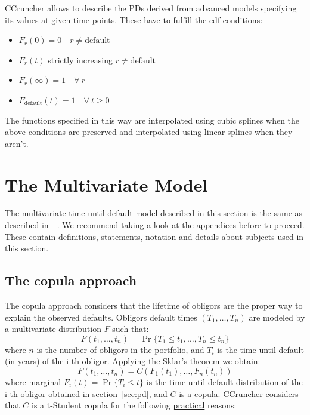 \documentclass[11pt,fleqn]{book} %
\begin{document}
CCruncher allows to describe the PDs derived from advanced models specifying 
its values at given time points. These have to fulfill the cdf conditions:
\begin{itemize}
	\item $F_r(0) = 0 \quad r \ne \text{default}$
	\item $F_r(t)$ strictly increasing $r \ne \text{default}$
	\item $F_r(\infty) = 1 \quad \forall\ r$
	\item $F_{\text{default}}(t) = 1 \quad \forall\ t \ge 0$
\end{itemize}
The functions specified in this way are interpolated using cubic splines
when the above conditions are preserved and interpolated using linear splines 
when they aren't.

\section{The Multivariate Model}

The multivariate time-until-default model described in this section is the 
same as described in~\cite{li:2000,roncalli:2001,frey:2001}~\cite[chap. 2.6]{bluhm:2002}.
We recommend taking a look at the appendices before to proceed. These contain 
definitions, statements, notation and details about subjects used in this 
section.

\subsection{The copula approach}
The copula approach considers that the lifetime of obligors are the 
proper way to explain the observed defaults. Obligors default times 
$(T_1,\dots,T_n)$ are modeled by a multivariate distribution $F$ such that:
\begin{displaymath}
	F(t_1, \dots, t_n) = \Pr \{T_1 \le t_1, \dots, T_n \le t_n\}
\end{displaymath}
where $n$ is the number of obligors in the portfolio, and $T_i$ is the 
time-until-default (in years) of the i-th obligor. Applying the Sklar's 
theorem we obtain:
\begin{displaymath}
	F(t_1, \dots, t_n) = 
	C\left(F_1(t_1), \dots, F_n(t_n)\right)
\end{displaymath}
where marginal $F_i(t) = \Pr\{T_i \le t\}$ is the time-until-default 
distribution of the i-th obligor obtained in section~\ref{sec:pd}, and $C$ 
is a copula. CCruncher considers that $C$ is a t-Student copula for the 
following \ul{practical} reasons:
\end{document}
